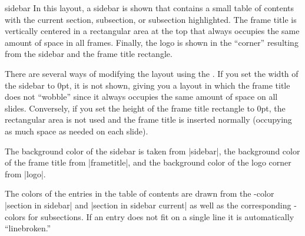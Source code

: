 \begin{outerthemeexample}{sidebar}
  In this layout, a sidebar is shown that contains a small table of
  contents with the current section, subsection, or subsection highlighted. The
  frame title is vertically centered in a rectangular area at the top
  that always occupies the same amount of space in all
  frames. Finally, the logo is shown in the ``corner'' resulting from
  the sidebar and the frame title rectangle.

  There are several ways of modifying the layout using the
  . If you set the width of the sidebar to 0pt, it is
  not shown, giving you a layout in which the frame title does not
  ``wobble'' since it always occupies the same amount of space on all
  slides. Conversely, if you set the height of the frame title
  rectangle to 0pt, the rectangular area is not used and the frame
  title is inserted normally (occupying as much space as needed on
  each slide).

  The background color of the sidebar is taken from |sidebar|, the
  background color of the frame title from |frametitle|, and the
  background color of the logo corner from |logo|.

  The colors of the entries in the table of contents are drawn from
  the \beamer-color |section in sidebar| and |section in sidebar current| as well as the
  corresponding \beamer-colors for subsections. If an entry does not
  fit on a single line it is automatically ``linebroken.''


\end{outerthemeexample}
